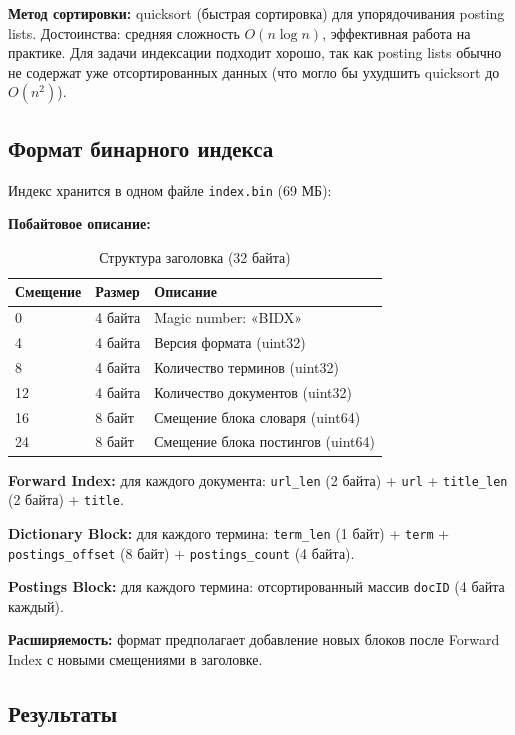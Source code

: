 \documentclass[a4paper,12pt]{article}
\begin{document}
\textbf{Метод сортировки:} quicksort (быстрая сортировка) для упорядочивания posting lists. Достоинства: средняя сложность $O(n \log n)$, эффективная работа на практике. Для задачи индексации подходит хорошо, так как posting lists обычно не содержат уже отсортированных данных (что могло бы ухудшить quicksort до $O(n^2)$).

\subsection{Формат бинарного индекса}

Индекс хранится в одном файле \texttt{index.bin} (69 МБ):

\textbf{Побайтовое описание:}

\begin{table}[H]
    \centering
    \caption{Структура заголовка (32 байта)}
    \begin{tabular}{llp{8cm}}
        \toprule
        \textbf{Смещение} & \textbf{Размер} & \textbf{Описание} \\
        \midrule
        0 & 4 байта & Magic number: «BIDX» \\
        4 & 4 байта & Версия формата (uint32) \\
        8 & 4 байта & Количество терминов (uint32) \\
        12 & 4 байта & Количество документов (uint32) \\
        16 & 8 байт & Смещение блока словаря (uint64) \\
        24 & 8 байт & Смещение блока постингов (uint64) \\
        \bottomrule
    \end{tabular}
\end{table}

\textbf{Forward Index:} для каждого документа: \texttt{url\_len} (2 байта) + \texttt{url} + \texttt{title\_len} (2 байта) + \texttt{title}.

\textbf{Dictionary Block:} для каждого термина: \texttt{term\_len} (1 байт) + \texttt{term} + \texttt{postings\_offset} (8 байт) + \texttt{postings\_count} (4 байта).

\textbf{Postings Block:} для каждого термина: отсортированный массив \texttt{docID} (4 байта каждый).

\textbf{Расширяемость:} формат предполагает добавление новых блоков после Forward Index с новыми смещениями в заголовке.

\subsection{Результаты}
\end{document}
